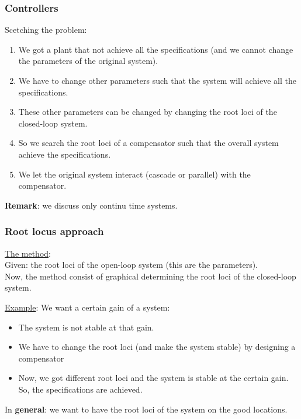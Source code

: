 \begin{frame}
	\frametitle{Controllers}
		Scetching the problem:
		\begin{enumerate}
			\item We got a plant that not achieve all the specifications (and we cannot change the parameters of the original system).
			\item We have to change other parameters such that the system will achieve all the specifications.
			\item These other parameters can be changed by changing the root loci of the closed-loop system. 
			\item So we search the root loci of a compensator such that the overall system achieve the specifications. 
			\item We let the original system interact (cascade or parallel) with the compensator.
		\end{enumerate}
		\vspace{3mm}
		
		\textbf{Remark}: we discuss only continu time systems. 
\end{frame}

\begin{frame}
	\frametitle{Root locus approach}
	\underline{The method}:\\
	Given: the root loci of the open-loop system (this are the parameters).\\
	Now, the method consist of graphical determining the root loci of the closed-loop system.\vspace{3mm}

	\underline{Example}: 
	We want a certain gain of a system:
	\begin{itemize}
		\item The system is not stable at that gain.
		\item We have to change the root loci (and make the system stable) by designing a compensator
		\item Now, we got different root loci and the system is stable at the certain gain. So, the specifications are achieved.
	\end{itemize}
	\vspace{2mm}
	
	In \textbf{general}: we want to have the root loci of the system on the good locations.
\end{frame}

